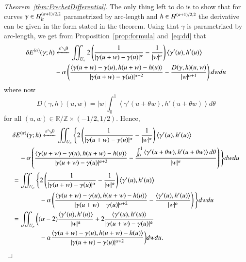 \begin{proof}[Theorem~\ref{thm:FrechetDifferential}]
 The only thing left to do is to show that for curves $\gamma \in H_{\mathrm{ir}}^{(\alpha+1)/2,2}$ parametrized by arc-length
 and $h \in H^{\scriptstyle (\alpha+1)/2,2}$ the derivative can be given in the form stated in the theorem.
 Using that $\gamma$ is parametrized by arc-length, we get from Proposition~\ref{prop:formula} 
 and~\eqref{eq:dd} that
 \begin{align*}
  \delta E^{(\alpha)}(\gamma;h) &\xleftarrow{\varepsilon \searrow 0} \iint_{U_\varepsilon} 2
\left(\frac 1 {|\gamma(u+w) - \gamma(u)|^\alpha} - \frac 1 {|w|^\alpha} \right) 
  \left\langle \gamma'(u), h'(u) \right\rangle  \\
  & - \alpha  \left(\frac{\left\langle {\gamma}(u+w)-{\gamma}(u) ,{h}(u+w)-{h}(u) \right\rangle }{|{\gamma}(u+w)-{\gamma}(u)|^{\alpha+2}}
    -\frac{D(\gamma,h)(u,w)}{|w|^{\alpha+1}}\right)
  dw du 
 \end{align*}
 where now 
 \begin{equation*}
  D(\gamma,h)(u,w) = |w|\int_0^1 \left\langle \gamma'(u+ \theta w), h'(u+\theta w) \right\rangle d\theta
 \end{equation*}
 for all $(u,w) \in \mathbb R / \mathbb Z \times (-1/2, 1/2)$. Hence,
 \begin{align*}
  &\delta E^{(\alpha)}(\gamma;h) 
  \xleftarrow{\varepsilon \searrow 0}\iint_{U_\varepsilon}  \Bigg\{2
    \left(\frac 1 {|\gamma(u+w) - \gamma(u)|^\alpha} - \frac 1 {|w|^\alpha} \right) 
    \left\langle \gamma'(u), h'(u) \right\rangle \\
    &\quad{} - \alpha  \left(\frac{\left\langle {\gamma}(u+w)-{\gamma}(u) ,{h}(u+w)-{h}(u) \right\rangle }{|{\gamma}(u+w)-{\gamma}(u)|^{\alpha+2}}
    -\frac{\int_0^1 \left\langle \gamma'(u+\theta w ), h'(u+\theta w) \right\rangle d\theta}
    {|w|^{\alpha}}\right) \Bigg\} dw du \\
  & = \iint_{U_\varepsilon} \Bigg\{ 2
    \left(\frac 1 {|\gamma(u+w) - \gamma(u)|^\alpha} - \frac 1 {|w|^\alpha} \right) 
    \left\langle \gamma'(u), h'(u) \right\rangle \\
    &\qquad\qquad{} - \alpha  \left(\frac{\left\langle {\gamma}(u+w)-{\gamma}(u) ,{h}(u+w)-{h}(u) \right\rangle }{|{\gamma}(u+w)-{\gamma}(u)|^{\alpha+2}}
    -\frac{\left\langle \gamma'(u), h'(u) \right\rangle}{|w|^{\alpha}}\right) \Bigg\}dw du\\
& = \iint_{U_\varepsilon} 
  \bigg((\alpha -2) \frac {\left\langle \gamma'(u), h'(u) \right\rangle} {|w|^\alpha} 
  + 2 \frac  {\left\langle \gamma'(u), h'(u) \right\rangle} {|\gamma(u+w) - \gamma(u)|^\alpha}
    \\
  &\qquad\qquad{} - \alpha  \frac{\left\langle {\gamma}(u+w)-{\gamma}(u) ,{h}(u+w)-{h}(u) \right\rangle }{|{\gamma}(u+w)-{\gamma}(u)|^{\alpha+2}} \bigg) dw du.
\end{align*}
\end{proof}